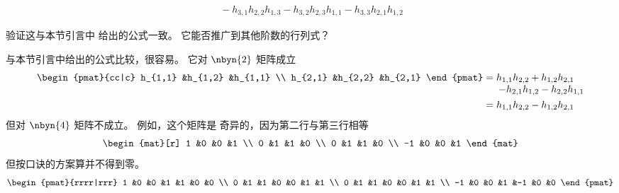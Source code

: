 \begin{exercises}
\begin{equation*}
\begin{array}{l}
      \>-h_{3,1}h_{2,2}h_{1,3}-h_{3,2}h_{2,3}h_{1,1}
        -h_{3,3}h_{2,1}h_{1,2}
      \end{array}
    \end{equation*}
    \begin{exparts}
      \partsitem 验证这与本节引言中
        给出的公式一致。
      \partsitem 它能否推广到其他阶数的行列式？
    \end{exparts}
    \begin{answer}
      \begin{exparts}
        \partsitem 与本节引言中给出的公式比较，很容易。
        \partsitem 它对 \( \nbyn{2} \) 矩阵成立
          \begin{align*}
            \begin{pmat}{cc|c}
              h_{1,1} &h_{1,2} &h_{1,1} \\
              h_{2,1} &h_{2,2} &h_{2,1}
            \end{pmat}
            &=\begin{array}[t]{@{}l@{}}
              h_{1,1}h_{2,2}+h_{1,2}h_{2,1}  \\
              \>-h_{2,1}h_{1,2}-h_{2,2}h_{1,1}
            \end{array}                                     \\
            &=h_{1,1}h_{2,2}-h_{1,2}h_{2,1}
          \end{align*}
          但对 \( \nbyn{4} \) 矩阵不成立。
          例如，这个矩阵是
          奇异的，因为第二行与第三行相等
          \begin{equation*}
            \begin{mat}[r]  
              1  &0  &0  &1   \\
              0  &1  &1  &0   \\
              0  &1  &1  &0   \\
             -1  &0  &0  &1  
            \end{mat}
          \end{equation*}
          但按口诀的方案算并不得到零。
          \begin{equation*}
            \begin{pmat}{rrrr|rrr}
                       1  &0  &0  &1  &1  &0  &0  \\
                       0  &1  &1  &0  &0  &1  &1  \\
                       0  &1  &1  &0  &0  &1  &1  \\
                      -1  &0  &0  &1  &-1 &0  &0
            \end{pmat}

\end{equation*}
\end{exparts}
\end{answer}
\end{exercises}
